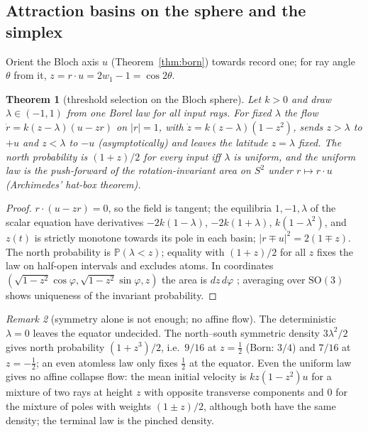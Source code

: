 \documentclass[aps,pra,onecolumn,superscriptaddress,nofootinbib,10pt]{revtex4-2}
\newtheorem{theorem}{Theorem}
\theoremstyle{definition}
\theoremstyle{remark}
\newtheorem{remark}[theorem]{Remark}
\newcommand{\SO}{\mathrm{SO}}
\begin{document}
\subsection{Attraction basins on the sphere and the simplex}\label{sec:sobasins}
Orient the Bloch axis $u$ (Theorem~\ref{thm:born}) towards record one; for ray angle $\theta$ from it, $z=r\cdot u=2w_1-1=\cos2\theta$.

\begin{theorem}[threshold selection on the Bloch sphere]\label{thm:sosphere}
Let $k>0$ and draw $\lambda\in(-1,1)$ from one Borel law for all input rays.  For fixed $\lambda$ the flow $\dot r=k(z-\lambda)(u-zr)$
on $\lvert r\rvert=1$, with $\dot z=k(z-\lambda)(1-z^2)$, sends $z>\lambda$ to $+u$ and $z<\lambda$ to $-u$ (asymptotically) and leaves the latitude
$z=\lambda$ fixed.  The north probability is $(1+z)/2$ for every input iff $\lambda$ is uniform, and the uniform law is the
push-forward of the rotation-invariant area on $S^2$ under $r\mapsto r\cdot u$ (Archimedes' hat-box theorem).
\end{theorem}
\begin{proof}
$r\cdot(u-zr)=0$, so the field is tangent; the equilibria $1,-1,\lambda$ of the scalar equation have derivatives $-2k(1-\lambda)$,
$-2k(1+\lambda)$, $k(1-\lambda^2)$, and $z(t)$ is strictly monotone towards its pole in each basin; $\lvert r\mp u\rvert^2=2(1\mp z)$.  The north
probability is $\mathbb P(\lambda<z)$; equality with $(1+z)/2$ for all $z$ fixes the law on half-open intervals and excludes atoms.  In
coordinates $(\sqrt{1-z^2}\cos\varphi,\sqrt{1-z^2}\sin\varphi,z)$ the area is $dz\,d\varphi$ \cite{n3:Archimedes}; averaging over $\SO(3)$ shows uniqueness of the
invariant probability.
\end{proof}

\begin{remark}[symmetry alone is not enough; no affine flow]\label{rem:sothresholds}
The deterministic $\lambda=0$ leaves the equator undecided.  The north--south symmetric density $3\lambda^2/2$ gives north
probability $(1+z^3)/2$, i.e.\ $9/16$ at $z=\tfrac12$ (Born: $3/4$) and $7/16$ at $z=-\tfrac12$; an even atomless law only fixes $\tfrac12$ at the
equator.  Even the uniform law gives no affine collapse flow: the mean initial velocity is $kz(1-z^2)u$ for a mixture
of two rays at height $z$ with opposite transverse components and $0$ for the mixture of poles with weights
$(1\pm z)/2$, although both have the same density; the terminal law is the pinched density.
\end{remark}
\end{document}

